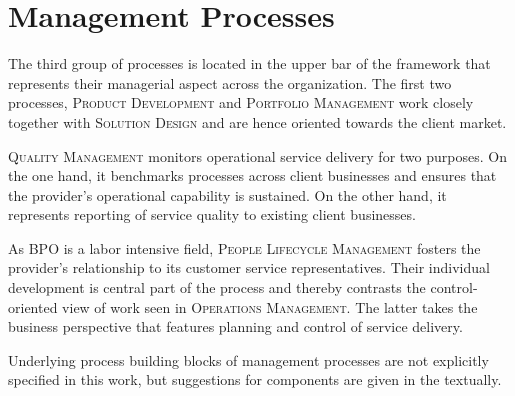 	
	
	
	
	
	
	
	
	
	
	
	
	
	
	\section{Management Processes}
	
	The third group of processes is located in the upper bar of the framework that represents their managerial aspect across the organization. The first two processes, \textsc{Product Development} and \textsc{Portfolio Management} work closely together with \textsc{Solution Design} and are hence oriented towards the client market. 
	
	\textsc{Quality Management} monitors operational service delivery for two purposes. On the one hand, it benchmarks processes across client businesses and ensures that the provider's operational capability is sustained. On the other hand, it represents reporting of service quality to existing client businesses.
	
	As \acrshort{BPO} is a labor intensive field, \textsc{People Lifecycle Management} fosters the provider's relationship to its customer service representatives. Their individual development is central part of the process and thereby contrasts the control-oriented view of work seen in \textsc{Operations Management}. The latter takes the business perspective that features planning and control of service delivery.
	
	Underlying process building blocks of management processes are not explicitly specified in this work, but suggestions for components are given in the textually. 
	
